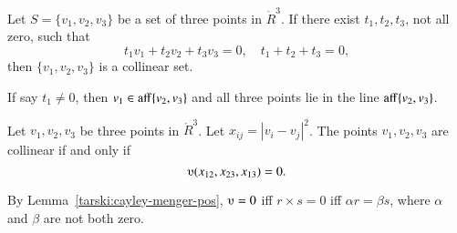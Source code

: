 \begin{tarskidata}
%
%






\begin{tarski}

\begin{lemma}
Let $S = \{v_1,v_2,v_3\}$ be a set of three
points in $\ring{R}^3$.  If there exist $t_1,t_2,t_3$, not all zero,
such that  $$
           t_1 v_1 + t_2 v_2 + t_3 v_3 = 0,\quad t_1+t_2+t_3=0,
           $$
then $\{v_1,v_2,v_3\}$ is a collinear set.
\end{lemma}

\begin{proved}
If say $t_1\ne0$, then $v_1\in {\operatorname{aff}}\{v_2,v_3\}$ and all three points
lie in the line ${\operatorname{aff}}\{v_2,v_3\}$.
\swallowed\end{proved}
\end{tarski}


\begin{tarski}

\begin{lemma}
Let $v_1,v_2,v_3$ be three points
in $\ring{R}^3$.  Let $x_{ij} = |v_i-v_j|^2$.
The points $v_1,v_2,v_3$ are collinear if and only if
	$$\ups(x_{12},x_{23},x_{13}) = 0.$$
\end{lemma}

\begin{proved}
By Lemma~\ref{tarski:cayley-menger-pos},
$\ups=0$ iff $r\times s = 0$ iff $\alpha r = \beta s$, where $\alpha$ and $\beta$ are
not both zero.
\swallowed\end{proved}
\end{tarski}







\end{tarskidata}

